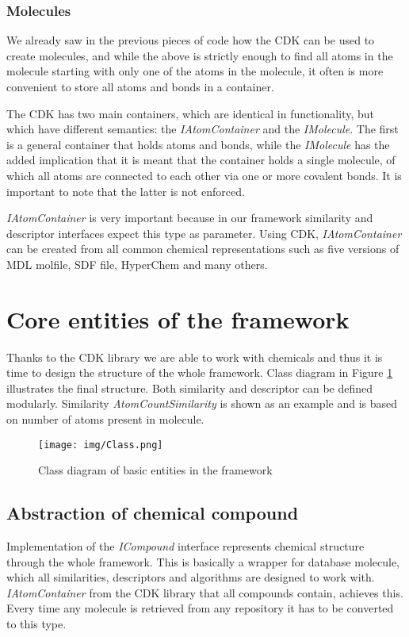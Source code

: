 \documentclass[thesis=M,english]{FITthesis}[2012/10/20]
\begin{document}
\subsubsection{Molecules}
We already saw in the previous pieces of code how the CDK can be used to create molecules, and while the above is strictly enough to find all atoms in the molecule starting with only one of the atoms in the molecule, it often is more convenient to store all atoms and bonds in a container. 

The CDK has two main containers, which are identical in functionality, but which have different semantics: the \textit{IAtomContainer} and the \textit{IMolecule}. The first is a general container that holds atoms and bonds, while the \textit{IMolecule} has the added implication that it is meant that the container holds a single molecule, of which all atoms are connected to each other via one or more covalent bonds. It is important to note that the latter is not enforced.\cite{cdk}

\textit{IAtomContainer} is very important because in our framework similarity and descriptor interfaces expect this type as parameter. Using CDK, \textit{IAtomContainer} can be created from all common chemical representations such as five versions of MDL molfile, SDF file, HyperChem and many others.



\section{Core entities of the framework}
\label{coreEntit}
Thanks to the CDK library we are able to work with chemicals and thus it is time to design the structure of the whole framework. Class diagram in Figure \ref{fig:classDiagram} illustrates the final structure. Both similarity and descriptor can be defined modularly. Similarity \textit{AtomCountSimilarity} is shown as an example and is based on number of atoms present in molecule.

\begin{figure}
  \centering
  \texttt{[image: img/Class.png]}
  \caption{Class diagram of basic entities in the framework}
  \label{fig:classDiagram}
\end{figure}

\subsection{Abstraction of chemical compound}
Implementation of the \textit{ICompound} interface represents chemical structure through the whole framework. This is basically a wrapper for database molecule, which all similarities, descriptors and algorithms are designed to work with. \textit{IAtomContainer} from the CDK library that all compounds contain, achieves this. Every time any molecule is retrieved from any repository it has to be converted to this type.
\end{document}
